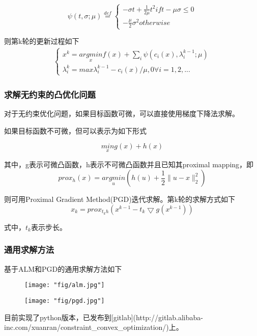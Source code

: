 $$
\psi (t, \sigma; \mu) \overset{def}= \left\{ 
\begin{matrix}
-\sigma t + \frac{1}{2\mu} t^2 if t-\mu \sigma \le 0\\
-\frac{\mu}{2}\sigma^2 otherwise
\end{matrix}
\right.
$$

则第k轮的更新过程如下
\begin{align}
\left\{
\begin{matrix}
x^k=\underset{x}{argmin}f(x)+\sum_i \psi(c_i(x), \lambda_i^{k-1};\mu) \\
\lambda_i^k=max{\lambda_i^{k-1}-c_i(x)/\mu, 0} \forall i=1,2,...
\end{matrix}
\right.
\end{align}



\subsubsection{求解无约束的凸优化问题}

对于无约束优化问题，如果目标函数可微，可以直接使用梯度下降法求解。

如果目标函数不可微，但可以表示为如下形式

$$
\underset{x}{min} g(x)+h(x)
$$

其中，g表示可微凸函数，h表示不可微凸函数并且已知其proximal mapping，即
$$
prox_h(x)=\underset{u}{argmin} (h(u)+\frac{1}{2}\|u-x\|_2^2)
$$

则可用Proximal Gradient Method(PGD)迭代求解。第k轮的求解方式如下
$$
x_k=prox_{t_kh}(x^{k-1}-t_k\bigtriangledown g(x^{k-1}))
$$

式中，$t_k$表示步长。

\subsubsection{通用求解方法}

基于ALM和PGD的通用求解方法如下

\begin{figure}[!h]
	\centering
	\texttt{[image: "fig/alm.jpg"]}
	\caption{}
	\label{fig:alm}
\end{figure}

\begin{figure}[!h]
	\centering
	\texttt{[image: "fig/pgd.jpg"]}
	\caption{}
	\label{fig:pgd}
\end{figure}

目前实现了python版本，已发布到[gitlab](http://gitlab.alibaba-inc.com/xuanran/constraint\_convex\_optimization/)上。

